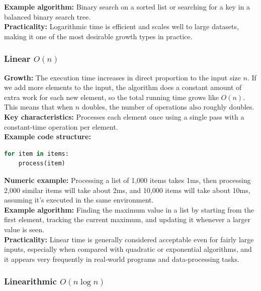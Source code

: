 \documentclass[12pt]{article}
\begin{document}
\noindent\textbf{Example algorithm:}
Binary search on a sorted list or searching for a key in a balanced binary search tree.\\

\noindent\textbf{Practicality:}
Logarithmic time is efficient and scales well to large datasets, making it one of the most desirable growth types in practice.

\subsubsection{Linear $O(n)$}

\noindent\textbf{Growth:}
The execution time increases in direct proportion to the input size $n$. If we add
more elements to the input, the algorithm does a constant amount of extra work for
each new element, so the total running time grows like $O(n)$. This means that
when $n$ doubles, the number of operations also roughly doubles.\\

\noindent\textbf{Key characteristics:}
Processes each element once using a single pass with a constant-time operation per element.\\

\noindent\textbf{Example code structure:}
\begin{lstlisting}[language=Python]
for item in items:
    process(item)
\end{lstlisting}

\noindent\textbf{Numeric example:}
Processing a list of 1,000 items takes 1ms, then processing 2,000 similar items will take about 2ms, and 10,000 items will take about 10ms, assuming it’s executed in the same environment.\\

\noindent\textbf{Example algorithm:}
Finding the maximum value in a list by starting from the first element, tracking the current maximum, and updating it whenever a larger value is seen.\\

\noindent\textbf{Practicality:}
Linear time is generally considered acceptable even for fairly large inputs, especially when compared with quadratic or exponential algorithms, and it appears very frequently in real‑world programs and data‑processing tasks.

\subsubsection{Linearithmic $O(n\log n)$}
\end{document}
